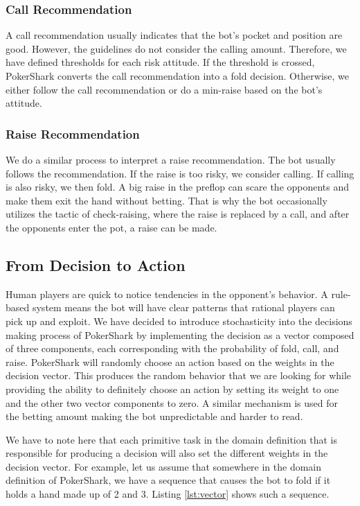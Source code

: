 \subsubsection{Call Recommendation}

A call recommendation usually indicates that the bot's pocket and position are good. However, the guidelines do not consider the calling amount. Therefore, we have defined thresholds for each risk attitude. If the threshold is crossed, PokerShark converts the call recommendation into a fold decision. Otherwise, we either follow the call recommendation or do a min-raise based on the bot's attitude.

\subsubsection{Raise Recommendation}
We do a similar process to interpret a raise recommendation. The bot usually follows the recommendation. If the raise is too risky, we consider calling. If calling is also risky, we then fold. A big raise in the preflop can scare the opponents and make them exit the hand without betting. That is why the bot occasionally utilizes the tactic of check-raising, where the raise is replaced by a call, and after the opponents enter the pot, a raise can be made.


\subsection{From Decision to Action}

Human players are quick to notice tendencies in the opponent's behavior. A rule-based system means the bot will have clear patterns that rational players can pick up and exploit. We have decided to introduce stochasticity into the decisions making process of PokerShark by implementing the decision as a vector composed of three components, each corresponding with the probability of fold, call, and raise. PokerShark will randomly choose an action based on the weights in the decision vector. This produces the random behavior that we are looking for while providing the ability to definitely choose an action by setting its weight to one and the other two vector components to zero. A similar mechanism is used for the betting amount making the bot unpredictable and harder to read.

We have to note here that each primitive task in the domain definition that is responsible for producing a decision will also set the different weights in the decision vector. For example, let us assume that somewhere in the domain definition of PokerShark, we have a sequence that causes the bot to fold if it holds a hand made up of 2 and 3. Listing \ref{lst:vector} shows such a sequence.

